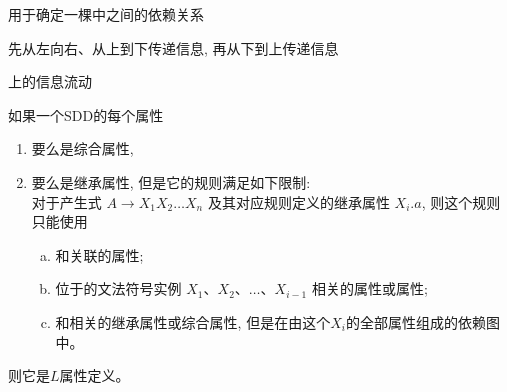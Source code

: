 \begin{frame}{}
  \begin{center}
    用于确定一棵中之间的依赖关系

    \vspace{0.50cm}


    \vspace{0.50cm}
     先从左向右、从上到下传递信息, 再从下到上传递信息
  \end{center}
\end{frame}

\begin{frame}{}
  \begin{center}
    \vspace{0.30cm}

    上的信息流动
  \end{center}
\end{frame}

\begin{frame}{}
  \begin{center}
    \begin{definition}
      如果一个SDD的每个属性
      \begin{enumerate}[(1)]
        \setlength{\itemsep}{8pt}
        \item 要么是综合属性,
        \item 要么是继承属性, 但是它的规则满足如下限制: \\
          对于产生式 $A \to X_{1}X_{2} \dots X_{n}$ 及其对应规则定义的继承属性 $X_{i}.a$,
          则这个规则只能使用
          \begin{enumerate}[(a)]
            \setlength{\itemsep}{6pt}
            \item 和关联的属性;
            \item 位于的文法符号实例 $X_{1}$、$X_{2}$、$\dots$、$X_{i-1}$
              相关的属性或属性;
            \item 和相关的继承属性或综合属性,
              但是在由这个$X_{i}$的全部属性组成的依赖图中。
          \end{enumerate}
      \end{enumerate}
      则它是$L$属性定义。
    \end{definition}
  \end{center}
\end{frame}

